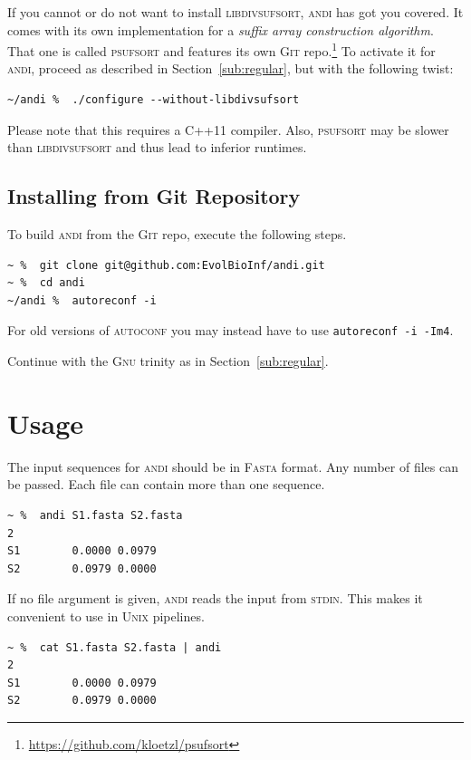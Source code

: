 \documentclass[a4paper,
  10pt,
  english,
  DIV=12,
  BCOR=8mm]{scrbook}
\newcommand{\algo}[1]{\textsc{{#1}}}
\newcommand{\andi}{\algo{andi} }
\begin{document}
If you cannot or do not want to install \algo{libdivsufsort}, \andi has got you covered. It comes with its own implementation for a \emph{suffix array construction algorithm}. That one is called \algo{psufsort} and features its own \algo{Git} repo.\footnote{\url{https://github.com/kloetzl/psufsort}} To activate it for \algo{andi}, proceed as described in Section~\ref{sub:regular}, but with the following twist:

\begin{lstlisting}
~/andi %  ./configure --without-libdivsufsort
\end{lstlisting}

Please note that this requires a C++11 compiler. Also, \algo{psufsort} may be slower than \algo{libdivsufsort} and thus lead to inferior runtimes.

\section{Installing from Git Repository}

To build \andi from the \algo{Git} repo, execute the following steps.

\begin{lstlisting}
~ %  git clone git@github.com:EvolBioInf/andi.git
~ %  cd andi
~/andi %  autoreconf -i
\end{lstlisting}

\noindent For old versions of \algo{autoconf} you may instead have to use \lstinline$autoreconf -i -Im4$.

\noindent Continue with the \algo{Gnu} trinity as in Section~\ref{sub:regular}.


\chapter{Usage} %

The input sequences for \andi should be in \algo{Fasta} format. Any number of files can be passed. Each file can contain more than one sequence.

\begin{lstlisting}
~ %  andi S1.fasta S2.fasta
2
S1        0.0000 0.0979
S2        0.0979 0.0000
\end{lstlisting}

If no file argument is given, \andi reads the input from \algo{stdin}. This makes it convenient to use in \algo{Unix} pipelines.

\begin{lstlisting}
~ %  cat S1.fasta S2.fasta | andi
2
S1        0.0000 0.0979
S2        0.0979 0.0000
\end{lstlisting}
\end{document}
